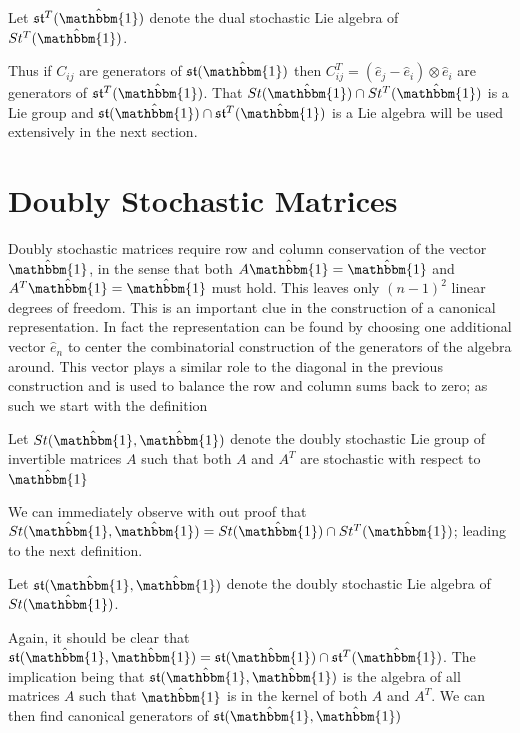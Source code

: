 \begin{definition}
	Let $\mathfrak{st}^T(\hat{\mathbbm{1}})$ denote the dual stochastic Lie 
	algebra of $St^T(\hat{\mathbbm{1}})$.
\end{definition}

Thus if $C_{ij}$ are generators of $\mathfrak{st}(\hat{\mathbbm{1}})$ then $C_{ij}^T = \left(\hat{e}_j - \hat{e}_i \right) \otimes \hat{e}_i$
are generators of $\mathfrak{st}^T(\hat{\mathbbm{1}})$. That $St(\hat{\mathbbm{1}}) \cap St^T(\hat{\mathbbm{1}})$ 
is a Lie group and $\mathfrak{st}(\hat{\mathbbm{1}}) \cap \mathfrak{st}^T(\hat{\mathbbm{1}})$ 
is a Lie algebra will be used extensively in the next section.

\section{Doubly Stochastic Matrices}
Doubly stochastic matrices require row and column conservation of the vector $\hat{\mathbbm{1}}$, 
in the sense that both $A \hat{\mathbbm{1}} = \hat{\mathbbm{1}}$ and $A^T \hat{\mathbbm{1}} = \hat{\mathbbm{1}}$ 
must hold. This leaves only $\left(n - 1\right)^2$ linear degrees of freedom. 
This is an important clue in the construction of a canonical representation. In 
fact the representation can be found by choosing one additional vector $\hat{e}_n$ 
to center the combinatorial construction of the generators of the algebra 
around. This vector plays a similar role to the diagonal in the previous 
construction and is used to balance the row and column sums back to zero; as 
such we start with the definition

\begin{definition}
	Let $St(\hat{\mathbbm{1}}, \hat{\mathbbm{1}})$ denote the doubly stochastic 
	Lie group of invertible matrices $A$ such that both $A$ and $A^T$ are 
	stochastic with respect to $\hat{\mathbbm{1}}$
\end{definition}

We can immediately observe with out proof that $St(\hat{\mathbbm{1}}, \hat{\mathbbm{1}}) = St(\hat{\mathbbm{1}}) \cap St^T(\hat{\mathbbm{1}})$;
leading to the next definition.

\begin{definition}
	Let $\mathfrak{st}(\hat{\mathbbm{1}}, \hat{\mathbbm{1}})$ denote the doubly 
	stochastic Lie algebra of $St(\hat{\mathbbm{1}})$.
\end{definition}

Again, it should be clear that $\mathfrak{st}(\hat{\mathbbm{1}}, \hat{\mathbbm{1}}) = \mathfrak{st}(\hat{\mathbbm{1}}) \cap \mathfrak{st}^T(\hat{\mathbbm{1}})$.
The implication being that $\mathfrak{st}(\hat{\mathbbm{1}}, \hat{\mathbbm{1}})$
is the algebra of all matrices $A$ such that $\hat{\mathbbm{1}}$ is in the 
kernel of both $A$ and $A^T$. We can then find canonical generators of $\mathfrak{st}(\hat{\mathbbm{1}}, \hat{\mathbbm{1}})$

